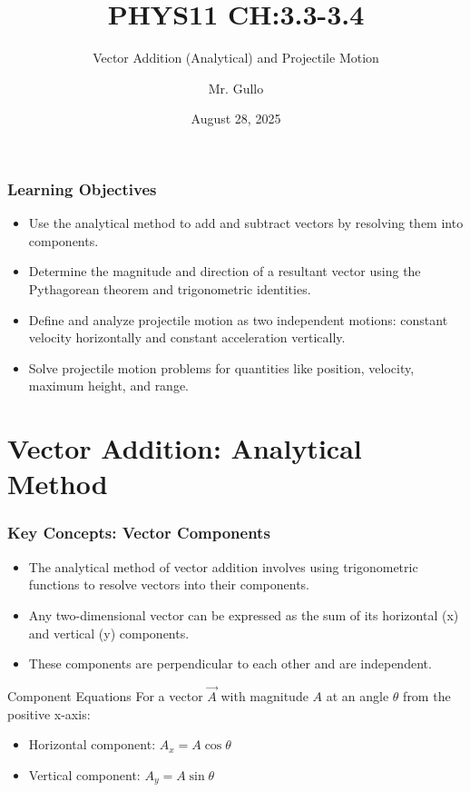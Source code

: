 \documentclass{beamer}
\title[Vector Analysis and Projectile Motion]{PHYS11 CH:3.3-3.4}
\subtitle{Vector Addition (Analytical) and Projectile Motion}
\author[Mr. Gullo]{Mr. Gullo}
\date[Aug 2025]{August 28, 2025}
\begin{document}
\frame{\titlepage}

\begin{frame}
\frametitle{Learning Objectives}
\begin{itemize}
    \item Use the analytical method to add and subtract vectors by resolving them into components.
    \pause
    \item Determine the magnitude and direction of a resultant vector using the Pythagorean theorem and trigonometric identities.
    \pause
    \item Define and analyze projectile motion as two independent motions: constant velocity horizontally and constant acceleration vertically.
    \pause
    \item Solve projectile motion problems for quantities like position, velocity, maximum height, and range.
\end{itemize}
\end{frame}

\section{Vector Addition: Analytical Method}

\begin{frame}
\frametitle{Key Concepts: Vector Components}
\begin{itemize}
    \item The \alert{analytical method} of vector addition involves using trigonometric functions to resolve vectors into their components.
    \pause
    \item Any two-dimensional vector can be expressed as the sum of its \alert{horizontal (x)} and \alert{vertical (y)} components.
    \pause
    \item These components are perpendicular to each other and are independent.
\end{itemize}
\begin{block}{Component Equations}
    For a vector $\vec{A}$ with magnitude $A$ at an angle $\theta$ from the positive x-axis:
    \begin{itemize}
        \item Horizontal component: $A_x = A \cos \theta$
        \item Vertical component: $A_y = A \sin \theta$
    \end{itemize}
\end{block}
\end{frame}
\end{document}
